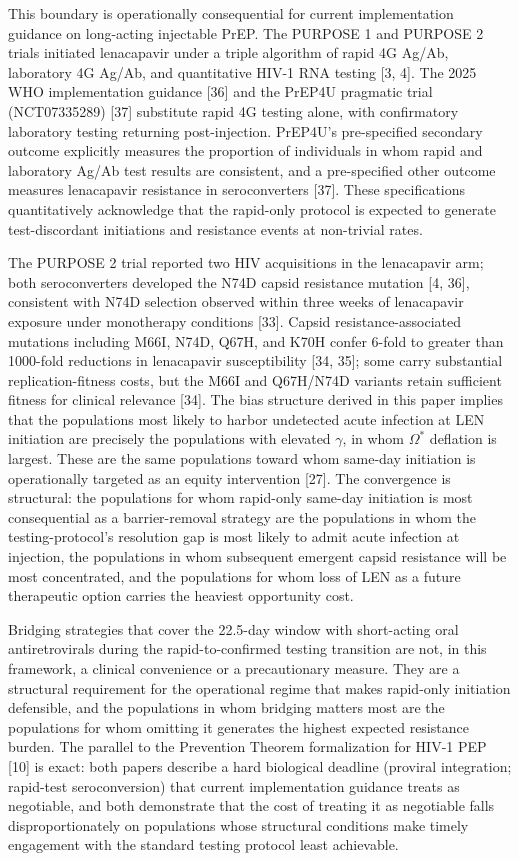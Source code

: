 \documentclass[12pt]{article}
\begin{document}
This boundary is operationally consequential for current implementation guidance on long-acting injectable PrEP. The PURPOSE 1 and PURPOSE 2 trials initiated lenacapavir under a triple algorithm of rapid 4G Ag/Ab, laboratory 4G Ag/Ab, and quantitative HIV-1 RNA testing [3, 4]. The 2025 WHO implementation guidance [36] and the PrEP4U pragmatic trial (NCT07335289) [37] substitute rapid 4G testing alone, with confirmatory laboratory testing returning post-injection. PrEP4U's pre-specified secondary outcome explicitly measures the proportion of individuals in whom rapid and laboratory Ag/Ab test results are consistent, and a pre-specified other outcome measures lenacapavir resistance in seroconverters [37]. These specifications quantitatively acknowledge that the rapid-only protocol is expected to generate test-discordant initiations and resistance events at non-trivial rates.

The PURPOSE 2 trial reported two HIV acquisitions in the lenacapavir arm; both seroconverters developed the N74D capsid resistance mutation [4, 36], consistent with N74D selection observed within three weeks of lenacapavir exposure under monotherapy conditions [33]. Capsid resistance-associated mutations including M66I, N74D, Q67H, and K70H confer 6-fold to greater than 1000-fold reductions in lenacapavir susceptibility [34, 35]; some carry substantial replication-fitness costs, but the M66I and Q67H/N74D variants retain sufficient fitness for clinical relevance [34]. The bias structure derived in this paper implies that the populations most likely to harbor undetected acute infection at LEN initiation are precisely the populations with elevated $\gamma$, in whom $\Omega^*$ deflation is largest. These are the same populations toward whom same-day initiation is operationally targeted as an equity intervention [27]. The convergence is structural: the populations for whom rapid-only same-day initiation is most consequential as a barrier-removal strategy are the populations in whom the testing-protocol's resolution gap is most likely to admit acute infection at injection, the populations in whom subsequent emergent capsid resistance will be most concentrated, and the populations for whom loss of LEN as a future therapeutic option carries the heaviest opportunity cost.

Bridging strategies that cover the 22.5-day window with short-acting oral antiretrovirals during the rapid-to-confirmed testing transition are not, in this framework, a clinical convenience or a precautionary measure. They are a structural requirement for the operational regime that makes rapid-only initiation defensible, and the populations in whom bridging matters most are the populations for whom omitting it generates the highest expected resistance burden. The parallel to the Prevention Theorem formalization for HIV-1 PEP [10] is exact: both papers describe a hard biological deadline (proviral integration; rapid-test seroconversion) that current implementation guidance treats as negotiable, and both demonstrate that the cost of treating it as negotiable falls disproportionately on populations whose structural conditions make timely engagement with the standard testing protocol least achievable.
\end{document}
